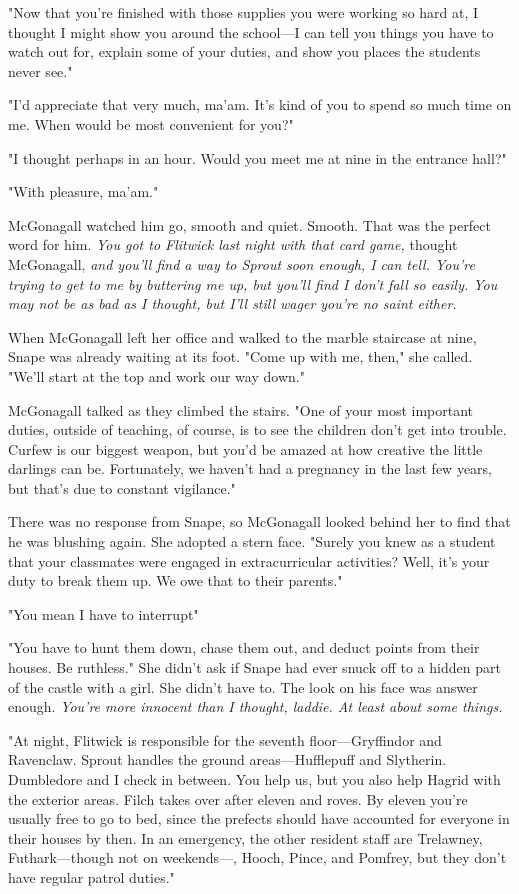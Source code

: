 "Now that you're finished with those supplies you were working so hard at, I thought I might show you around the school—I can tell you things you have to watch out for, explain some of your duties, and show you places the students never see."

"I'd appreciate that very much, ma'am. It's kind of you to spend so much time on me. When would be most convenient for you?"

"I thought perhaps in an hour. Would you meet me at nine in the entrance hall?"

"With pleasure, ma'am."

McGonagall watched him go, smooth and quiet. Smooth. That was the perfect word for him. \emph{You got to Flitwick last night with that card game,} thought McGonagall, \emph{and you'll find a way to Sprout soon enough, I can tell. You're trying to get to me by buttering me up, but you'll find I don't fall so easily. You may not be as bad as I thought, but I'll still wager you're no saint either.}

When McGonagall left her office and walked to the marble staircase at nine, Snape was already waiting at its foot. "Come up with me, then," she called. "We'll start at the top and work our way down."

McGonagall talked as they climbed the stairs. "One of your most important duties, outside of teaching, of course, is to see the children don't get into trouble. Curfew is our biggest weapon, but you'd be amazed at how creative the little darlings can be. Fortunately, we haven't had a pregnancy in the last few years, but that's due to constant vigilance."

There was no response from Snape, so McGonagall looked behind her to find that he was blushing again. She adopted a stern face. "Surely you knew as a student that your classmates were engaged in extracurricular activities? Well, it's your duty to break them up. We owe that to their parents."

"You mean I have to interrupt{\el}"

"You have to hunt them down, chase them out, and deduct points from their houses. Be ruthless." She didn't ask if Snape had ever snuck off to a hidden part of the castle with a girl. She didn't have to. The look on his face was answer enough. \emph{You're more innocent than I thought, laddie. At least about some things.}

"At night, Flitwick is responsible for the seventh floor—Gryffindor and Ravenclaw. Sprout handles the ground areas—Hufflepuff and Slytherin. Dumbledore and I check in between. You help us, but you also help Hagrid with the exterior areas. Filch takes over after eleven and roves. By eleven you're usually free to go to bed, since the prefects should have accounted for everyone in their houses by then. In an emergency, the other resident staff are Trelawney, Futhark—though not on weekends—, Hooch, Pince, and Pomfrey, but they don't have regular patrol duties."

